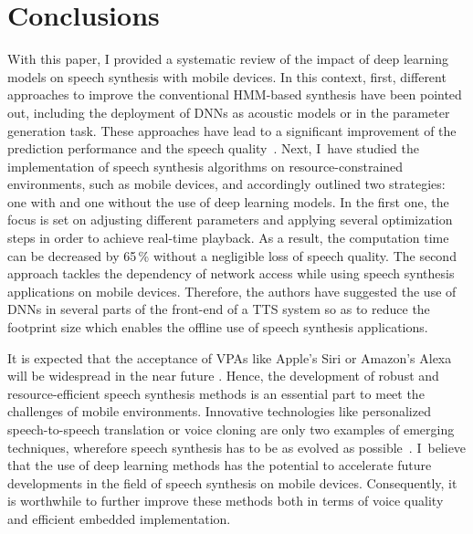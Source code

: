 

\section{Conclusions}
\label{sec:conclusion}

With this paper, I provided a systematic review of the impact of deep learning models on speech synthesis with mobile devices. In this context, first, different approaches to improve the conventional \ac{HMM}-based synthesis have been pointed out, including the deployment of \acp{DNN} as acoustic models or in the parameter generation task. These approaches have lead to a significant improvement of the prediction performance and the speech quality~\cite{zen:deepstatistical, hashimoto:effect}. Next, I~have studied the implementation of speech synthesis algorithms on resource-constrained environments, such as mobile devices, and accordingly outlined two strategies: one with and one without the use of deep learning models. In the first one, the focus is set on adjusting different parameters and applying several optimization steps \cite{toth:optimizing} in order to achieve real-time playback. As a result, the computation time can be decreased by 65\,\% without a negligible loss of speech quality. The second approach \cite{boros:robust} tackles the dependency of network access while using speech synthesis applications on mobile devices. Therefore, the authors have suggested the use of \acp{DNN} in several parts of the front-end of a \ac{TTS} system so as to reduce the footprint size which enables the offline use of speech synthesis applications.

It is expected that the acceptance of \acp{VPA} like Apple's Siri or Amazon's Alexa will be widespread in the near future \cite{gartner:assistants}. Hence, the development of robust and resource-efficient speech synthesis methods is an essential part to meet the challenges of mobile environments. Innovative technologies like personalized speech-to-speech translation or voice cloning are only two examples of emerging techniques, wherefore speech synthesis has to be as evolved as possible~\cite{edinburgh:speech}. I~believe that the use of deep learning methods has the potential to accelerate future developments in the field of speech synthesis on mobile devices. Consequently, it is worthwhile to further improve these methods both in terms of voice quality and efficient embedded implementation. %